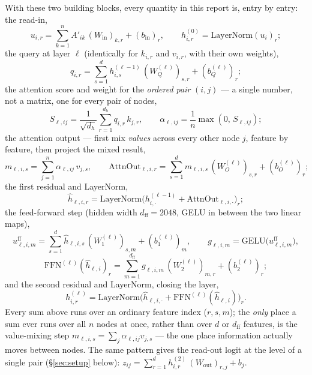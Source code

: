 \documentclass[11pt,a4paper]{article}
\begin{document}
With these two building blocks, every quantity in this report is, entry by entry: the read-in,
\[ u_{i,r} = \sum_{k=1}^n A'_{ik}\,(W_{\mathrm{in}})_{k,r} + (b_{\mathrm{in}})_r,
\qquad h^{(0)}_{i,r} = \mathrm{LayerNorm}(u_i)_r; \]
the query at layer $\ell$ (identically for $k_{i,r}$ and $v_{i,r}$, with their own weights),
\[ q_{i,r} = \sum_{s=1}^{d} h^{(\ell-1)}_{i,s}\,(W_Q^{(\ell)})_{s,r} + (b_Q^{(\ell)})_r; \]
the attention score and weight for the \emph{ordered pair} $(i,j)$ --- a single number, not a
matrix, one for every pair of nodes,
\[ S_{\ell,ij} = \frac{1}{\sqrt{d_h}}\sum_{r=1}^{d_h} q_{i,r}\,k_{j,r},
\qquad \alpha_{\ell,ij} = \frac1n\max(0,\,S_{\ell,ij}); \]
the attention output --- first mix \emph{values} across every other node $j$, feature by feature,
then project the mixed result,
\[ m_{\ell,i,s} = \sum_{j=1}^n \alpha_{\ell,ij}\,v_{j,s},
\qquad \mathrm{AttnOut}_{\ell,i,r} = \sum_{s=1}^{d} m_{\ell,i,s}\,(W_O^{(\ell)})_{s,r} + (b_O^{(\ell)})_r; \]
the first residual and LayerNorm,
\[ \widehat h_{\ell,i,r} = \mathrm{LayerNorm}\big(h^{(\ell-1)}_{i,\cdot} + \mathrm{AttnOut}_{\ell,i,\cdot}\big)_r; \]
the feed-forward step (hidden width $d_{\mathrm{ff}}=2048$, GELU in between the two linear maps),
\[ u^{\mathrm{ff}}_{\ell,i,m} = \sum_{s=1}^{d} \widehat h_{\ell,i,s}\,(W_1^{(\ell)})_{s,m} + (b_1^{(\ell)})_m,
\qquad g_{\ell,i,m} = \mathrm{GELU}\big(u^{\mathrm{ff}}_{\ell,i,m}\big), \]
\[ \mathrm{FFN}^{(\ell)}(\widehat h_{\ell,i})_r = \sum_{m=1}^{d_{\mathrm{ff}}} g_{\ell,i,m}\,(W_2^{(\ell)})_{m,r} + (b_2^{(\ell)})_r; \]
and the second residual and LayerNorm, closing the layer,
\[ h^{(\ell)}_{i,r} = \mathrm{LayerNorm}\big(\widehat h_{\ell,i,\cdot} + \mathrm{FFN}^{(\ell)}(\widehat h_{\ell,i})\big)_r. \]
Every sum above runs over an ordinary feature index ($r,s,m$); the \emph{only} place a sum ever
runs over all $n$ nodes at once, rather than over $d$ or $d_{\mathrm{ff}}$ features, is the
value-mixing step $m_{\ell,i,s}=\sum_j\alpha_{\ell,ij}v_{j,s}$ --- the one place information
actually moves between nodes. The same pattern gives the read-out logit at the level of a single
pair (\S\ref{sec:setup} below): $z_{ij} = \sum_{r=1}^{d} h^{(2)}_{i,r}\,(W_{\mathrm{out}})_{r,j} + b_j$.
\end{document}
